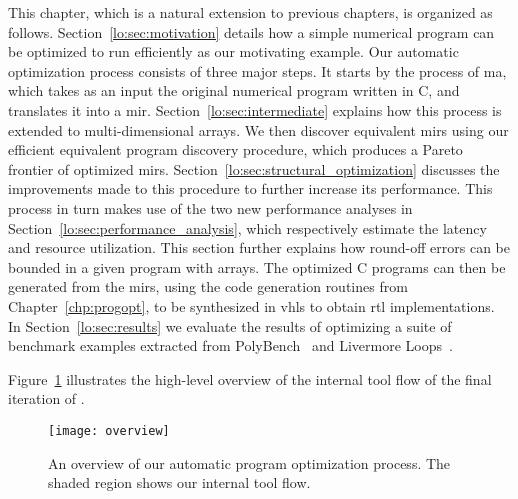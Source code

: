This chapter, which is a natural extension to previous chapters, is
organized as follows.  Section~\ref{lo:sec:motivation} details how a
simple numerical program can be optimized to run efficiently as our
motivating example.  Our automatic optimization process consists of
three major steps.  It starts by the process of \acrlong{ma}, which
takes as an input the original numerical program written in C, and
translates it into a \gls{mir}.  Section~\ref{lo:sec:intermediate}
explains how this process is extended to multi-dimensional arrays.  We
then discover equivalent \glspl{mir} using our efficient equivalent
program discovery procedure, which produces a Pareto frontier of optimized
\glspl{mir}.  Section~\ref{lo:sec:structural_optimization} discusses the
improvements made to this procedure to further increase its performance.
This process in turn makes use of the two new performance analyses in
Section~\ref{lo:sec:performance_analysis}, which respectively estimate the
latency and resource utilization.  This section further explains how round-off
errors can be bounded in a given program with arrays.  The optimized C
programs can then be generated from the \glspl{mir}, using the code generation
routines from Chapter~\ref{chp:progopt}, to be synthesized in \gls{vhls} to
obtain \gls{rtl} implementations.  In Section~\ref{lo:sec:results} we evaluate
the results of optimizing a suite of benchmark examples extracted from
PolyBench~\cite{polybench} and Livermore Loops~\cite{livermore}.

Figure~\ref{lo:fig:overview} illustrates the high-level overview of the
internal tool flow of the final iteration of \soap.
\begin{figure}[ht]
    \centering
    \texttt{[image: overview]}
    \caption{%
        An overview of our automatic program optimization process. The shaded
        region shows our internal tool flow.
    }\label{lo:fig:overview}
\end{figure}
